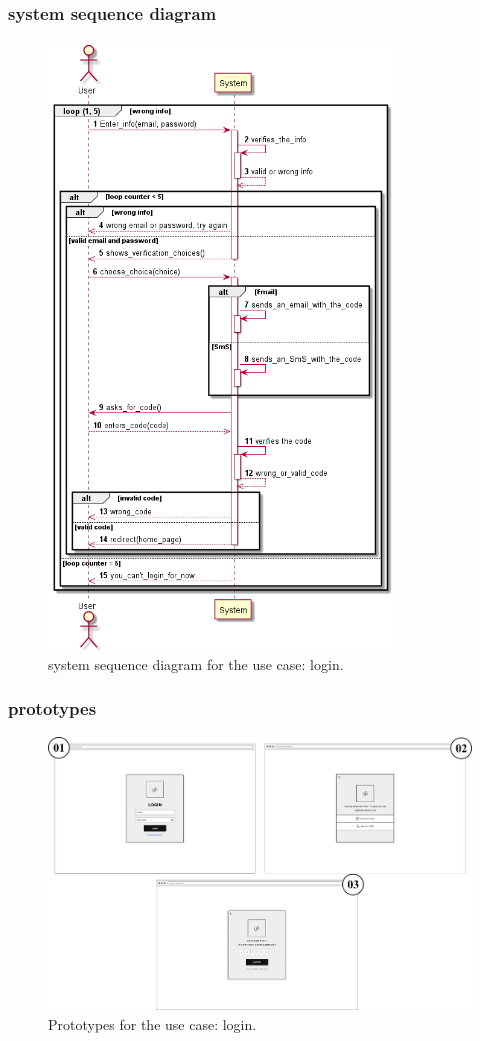 \documentclass[]{uc2pfecaneva}
\begin{document}
\subsubsection{system sequence diagram}
     \begin{figure}[h]
	
	\centering
	\includegraphics[width=260pt]{images/Login_dss}
	
	\caption{system sequence diagram for the use case: login.}
\end{figure}
\clearpage

\subsubsection{prototypes}
     \begin{figure}[h]
	
	\centering
	\includegraphics[width=\textwidth]{images/login}
	
	\caption{Prototypes for the use case: login.}
\end{figure}
\clearpage
\end{document}
